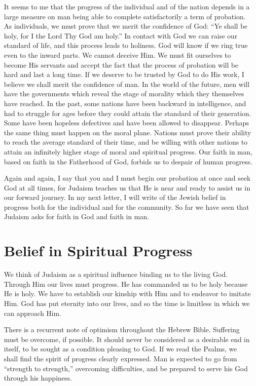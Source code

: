 It seems to me that the progress of the individual and
of the nation depends in a large measure on man being able
to complete satisfactorily a term of probation. As individuals,
we must prove that we merit the confidence of God:
``Ye shall be holy, for I the Lord Thy God am holy.'' In
contact with God we can raise our standard of life, and
this process leads to holiness. God will know if we ring
true even to the inward parts. We cannot deceive Him. We
must fit ourselves to become His servants and accept the
fact that the process of probation will be hard and last a
long time. If we deserve to be trusted by God to do His
work, I believe we shall merit the confidence of man. In
the world of the future, men will have the governments
which reveal the stage of morality which they themselves
have reached. In the past, some nations have been backward
in intelligence, and had to struggle for ages before they
could attain the standard of their generation. Some have
been hopeless defectives and have been allowed to disappear.
Perhaps the same thing must happen on the moral
plane. Nations must prove their ability to reach the
average standard of their time, and be willing with other
nations to attain an infinitely higher stage of moral and
spiritual progress. Our faith in man, based on faith in
the Fatherhood of God, forbids us to despair of human
progress.

Again and again, I say that you and I must begin our
probation at once and seek God at all times, for Judaism
teaches us that He is near and ready to assist us in our
forward journey. In my next letter, I will write of the
Jewish belief in progress both for the individual and for
the community. So far we have seen that Judaism asks for
faith in God and faith in man.


\section*{Belief in Spiritual Progress}

We think of Judaism as a spiritual influence binding
us to the living God. Through Him our lives must progress.
He has commanded us to be holy because He is holy. We have
to establish our kinship with Him and to endeavor to
imitate Him. God has put eternity into our lives, and so
the time is limitless in which we can approach Him.

There is a recurrent note of optimism throughout the
Hebrew Bible. Suffering must be overcome, if possible. It
should never be considered as a desirable end in itself, to
be sought as a condition pleasing to God. If we read the
Psalms, we shall find the spirit of progress clearly
expressed. Man is expected to go from ``strength to
strength,'' overcoming difficulties, and be prepared to
serve his God through his happiness.

